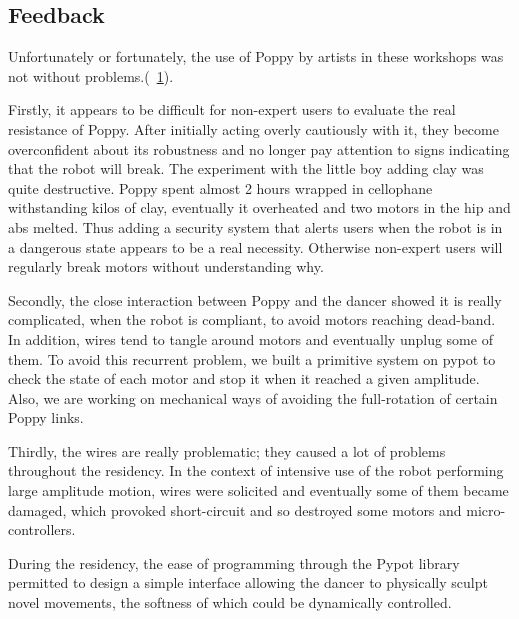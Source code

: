 \subsection{Feedback} %

Unfortunately or fortunately, the use of Poppy by artists  in these workshops  was not without problems.(\figurename~\ref{fig:broken_poppy_residency}).

Firstly, it appears to be difficult for non-expert users to evaluate the real resistance of Poppy. After initially acting overly cautiously with it, they become overconfident about its robustness and no longer pay attention to signs indicating that the robot will break. The experiment with the little boy adding clay was quite destructive. Poppy spent almost 2 hours wrapped in cellophane withstanding kilos of clay, eventually it overheated and two motors in the hip and abs melted.
Thus adding a security system that alerts users when the robot is in a dangerous state appears to be a real necessity.  Otherwise non-expert users will regularly break motors without understanding why.

\begin{figure}[]
\centering
    \hfil
    \caption{}
    \label{fig:broken_poppy_residency}
\end{figure}

Secondly, the close interaction between Poppy and the dancer showed it is really complicated, when the robot is compliant, to avoid motors reaching dead-band. In addition, wires tend to tangle around motors and eventually unplug some of them. To avoid this recurrent problem, we built a primitive system on pypot  to check the state of each motor and stop it when it reached a given amplitude. Also, we are working on mechanical ways of avoiding the full-rotation of certain Poppy links.

Thirdly, the wires are really problematic; they caused a lot of problems throughout the residency. In the context of intensive use of the robot performing large amplitude motion, wires were solicited and eventually some of them became damaged, which provoked short-circuit and so destroyed some motors and micro-controllers.

During the residency, the ease of programming through the Pypot library permitted to design a simple interface allowing the dancer to physically sculpt novel movements, the softness of which could be dynamically controlled.

